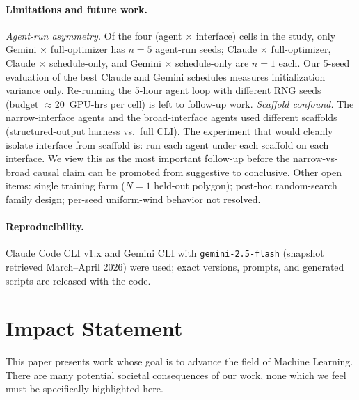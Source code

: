 \documentclass{article}
\begin{document}
\paragraph{Limitations and future work.}
\emph{Agent-run asymmetry.} Of the four (agent $\times$ interface)
cells in the study, only Gemini $\times$ full-optimizer has
$n{=}5$ agent-run seeds; Claude $\times$ full-optimizer, Claude
$\times$ schedule-only, and Gemini $\times$ schedule-only are
$n{=}1$ each. Our 5-seed evaluation of the best Claude and Gemini
schedules measures initialization variance only. Re-running the
5-hour agent loop with different RNG seeds (budget
$\approx$20~GPU-hrs per cell) is left to follow-up work.
\emph{Scaffold confound.} The narrow-interface agents and the
broad-interface agents used different scaffolds (structured-output
harness vs.\ full CLI). The experiment that would cleanly isolate
interface from scaffold is: run each agent under each scaffold on
each interface. We view this as the most important follow-up before
the narrow-vs-broad causal claim can be promoted from suggestive to
conclusive. Other open items: single training farm ($N{=}1$
held-out polygon); post-hoc random-search family design; per-seed
uniform-wind behavior not resolved.

\paragraph{Reproducibility.}
Claude Code CLI v1.x and Gemini CLI with \texttt{gemini-2.5-flash}
(snapshot retrieved March--April 2026) were used; exact versions,
prompts, and generated scripts are released with the code.

\section*{Impact Statement}

This paper presents work whose goal is to advance the field of Machine
Learning. There are many potential societal consequences of our work,
none which we feel must be specifically highlighted here.



\end{document}
